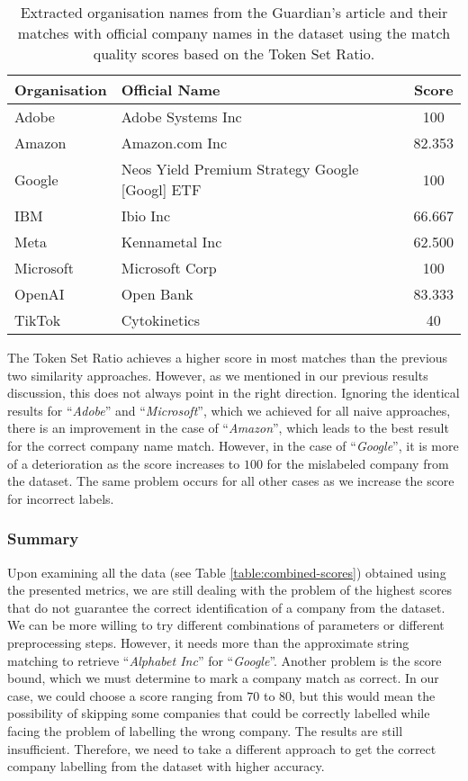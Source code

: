 \begin{table}[ht]
    \centering
    \caption{Extracted organisation names from the Guardian's article and their matches with official company names in the dataset using the match quality scores based on the Token Set Ratio.}
    \label{table:token-set-ratio}
    \begin{tabular}{l l c}
        \hline
        Organisation & Official Name & Score \\
        \hline
        Adobe & Adobe Systems Inc & 100 \\
        Amazon & Amazon.com Inc & 82.353 \\
        Google & Neos Yield Premium Strategy Google [Googl] ETF & 100 \\
        IBM & Ibio Inc & 66.667 \\
        Meta & Kennametal Inc & 62.500 \\
        Microsoft & Microsoft Corp & 100 \\
        OpenAI & Open Bank & 83.333 \\
        TikTok & Cytokinetics & 40 \\
        \hline
    \end{tabular}
\end{table}

The Token Set Ratio achieves a higher score in most matches than the previous two similarity approaches. However, as we mentioned in our previous results discussion, this does not always point in the right direction. Ignoring the identical results for ``\textit{Adobe}'' and ``\textit{Microsoft}'', which we achieved for all naive approaches, there is an improvement in the case of ``\textit{Amazon}'', which leads to the best result for the correct company name match. However, in the case of ``\textit{Google}'', it is more of a deterioration as the score increases to $100$ for the mislabeled company from the dataset. The same problem occurs for all other cases as we increase the score for incorrect labels.

\subsubsection*{Summary}
\label{subsubsec:naive-approach-summary}
Upon examining all the data (see Table \ref{table:combined-scores}) obtained using the presented metrics, we are still dealing with the problem of the highest scores that do not guarantee the correct identification of a company from the dataset. We can be more willing to try different combinations of parameters or different preprocessing steps. However, it needs more than the approximate string matching to retrieve ``\textit{Alphabet Inc}'' for ``\textit{Google}''. Another problem is the score bound, which we must determine to mark a company match as correct. In our case, we could choose a score ranging from $70$ to $80$, but this would mean the possibility of skipping some companies that could be correctly labelled while facing the problem of labelling the wrong company. The results are still insufficient. Therefore, we need to take a different approach to get the correct company labelling from the dataset with higher accuracy.

